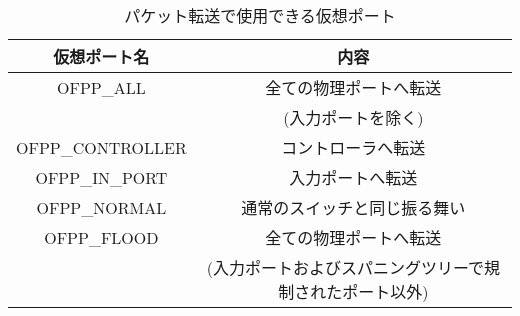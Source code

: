 \begin{table}[tb]
	\begin{center}
		\caption{パケット転送で使用できる仮想ポート}
		\begin{tabular}{c|c}
			\hline \hline
			仮想ポート名 & 内容　\\ \hline
			OFPP\_ALL & 全ての物理ポートへ転送　\\
			　& (入力ポートを除く)　\\
			OFPP\_CONTROLLER & コントローラへ転送 \\
			OFPP\_IN\_PORT & 入力ポートへ転送　\\
			OFPP\_NORMAL & 通常のスイッチと同じ振る舞い　\\
			OFPP\_FLOOD & 全ての物理ポートへ転送　\\
			 & (入力ポートおよびスパニングツリーで規制されたポート以外) \\ \hline
		\end{tabular}
		\label{tab:2-2}
	\end{center}
\end{table}

